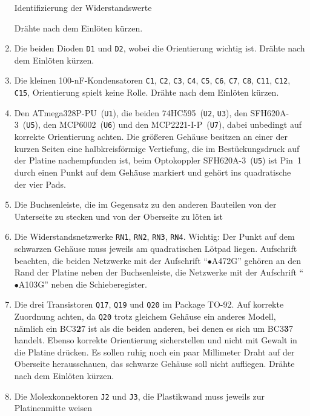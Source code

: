 \documentclass[paper=a4, open=any, numbers=noenddot]{scrbook}
\begin{document}
\begin{enumerate}
\begin{table}
\begin{center}
\begin{minipage}[b]{.2\textwidth}
							      \end{minipage}
						      \end{center}
						      \caption{Identifizierung der Widerstandswerte}
						      \label{tab:widerstandswerte}
					      \end{table}
					      Drähte nach dem Einlöten kürzen.

					\item Die beiden Dioden \texttt{D1} und \texttt{D2}, wobei die Orientierung wichtig ist. Drähte nach dem Einlöten kürzen.
					\item Die kleinen 100-nF-Kondensatoren \texttt{C1}, \texttt{C2}, \texttt{C3}, \texttt{C4}, \texttt{C5}, \texttt{C6}, \texttt{C7}, \texttt{C8}, \texttt{C11}, \texttt{C12}, \texttt{C15}, Orientierung spielt keine Rolle. Drähte nach dem Einlöten kürzen.
					\item Den ATmega328P-PU~(\texttt{U1}), die beiden 74HC595~(\texttt{U2}, \texttt{U3}), den SFH620A-3~(\texttt{U5}), den MCP6002~(\texttt{U6}) und den MCP2221-I-P~(\texttt{U7}), dabei unbedingt auf korrekte Orientierung achten. Die größeren Gehäuse besitzen an einer der kurzen Seiten eine halbkreisförmige Vertiefung, die im Bestückungsdruck auf der Platine nachempfunden ist, beim Optokoppler SFH620A-3~(\texttt{U5}) ist Pin~1 durch einen Punkt auf dem Gehäuse markiert und gehört ins quadratische der vier Pads.
					\item Die Buchsenleiste, die im Gegensatz zu den anderen Bauteilen von der Unterseite zu stecken und von der Oberseite zu löten ist
					\item Die Widerstandsnetzwerke \texttt{RN1}, \texttt{RN2}, \texttt{RN3}, \texttt{RN4}. Wichtig: Der Punkt auf dem schwarzen Gehäuse muss jeweils am quadratischen Lötpad liegen. Aufschrift beachten, die beiden Netzwerke mit der Aufschrift \enquote{$\bullet$A472G} gehören an den Rand der Platine neben der Buchsenleiste, die Netzwerke mit der Aufschrift \enquote{$\bullet$A103G} neben die Schieberegister.
					\item Die drei Transistoren \texttt{Q17}, \texttt{Q19} und \texttt{Q20} im Package TO-92. Auf korrekte Zuordnung achten, da \texttt{Q20} trotz gleichem Gehäuse ein anderes Modell, nämlich ein BC3\textbf{2}7 ist als die beiden anderen, bei denen es sich um BC3\textbf{3}7 handelt. Ebenso korrekte Orientierung sicherstellen und nicht mit Gewalt in die Platine drücken. Es sollen ruhig noch ein paar Millimeter Draht auf der Oberseite herausschauen, das schwarze Gehäuse soll nicht aufliegen. Drähte nach dem Einlöten kürzen.
					\item Die Molexkonnektoren \texttt{J2} und \texttt{J3}, die Plastikwand muss jeweils zur Platinenmitte weisen

\end{enumerate}
\end{document}
